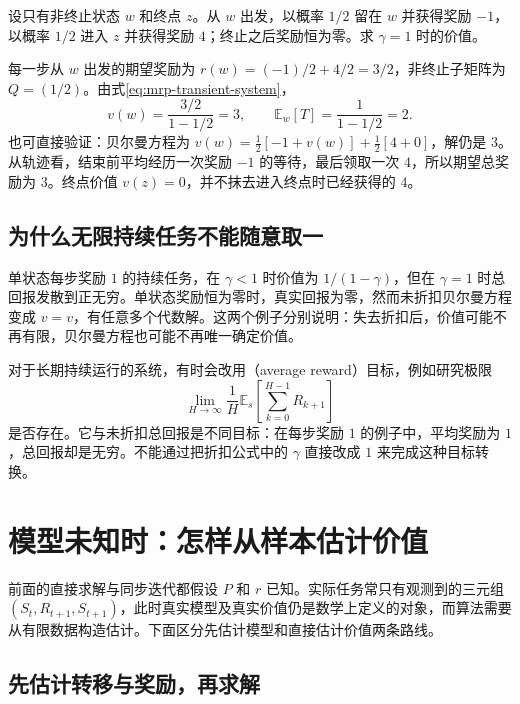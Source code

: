 \documentclass[UTF8]{ctexart}
\begin{document}
\begin{example}[反复等待后结束的未折扣任务]
\label{ex:mrp-terminal}
设只有非终止状态 $w$ 和终点 $z$。从 $w$ 出发，以概率 $1/2$ 留在 $w$ 并获得奖励 $-1$，以概率 $1/2$ 进入 $z$ 并获得奖励 $4$；终止之后奖励恒为零。求 $\gamma=1$ 时的价值。
\end{example}

\begin{solve}
每一步从 $w$ 出发的期望奖励为 $r(w)=(-1)/2+4/2=3/2$，非终止子矩阵为 $Q=(1/2)$。由式\eqref{eq:mrp-transient-system}，
\[
  v(w)=\frac{3/2}{1-1/2}=3,\qquad \mathbb E_w[T]=\frac{1}{1-1/2}=2.
\]
也可直接验证：贝尔曼方程为 $v(w)=\tfrac12[-1+v(w)]+\tfrac12[4+0]$，解仍是 $3$。从轨迹看，结束前平均经历一次奖励 $-1$ 的等待，最后领取一次 $4$，所以期望总奖励为 $3$。终点价值 $v(z)=0$，并不抹去进入终点时已经获得的 $4$。
\end{solve}

\subsection{为什么无限持续任务不能随意取一}

单状态每步奖励 $1$ 的持续任务，在 $\gamma<1$ 时价值为 $1/(1-\gamma)$，但在 $\gamma=1$ 时总回报发散到正无穷。单状态奖励恒为零时，真实回报为零，然而未折扣贝尔曼方程变成 $v=v$，有任意多个代数解。这两个例子分别说明：失去折扣后，价值可能不再有限，贝尔曼方程也可能不再唯一确定价值。

对于长期持续运行的系统，有时会改用（average reward）目标，例如研究极限
\[
  \lim_{H\to\infty}\frac1H
  \mathbb E_s\!\left[\sum_{k=0}^{H-1}R_{k+1}\right]
\]
是否存在。它与未折扣总回报是不同目标：在每步奖励 $1$ 的例子中，平均奖励为 $1$，总回报却是无穷。不能通过把折扣公式中的 $\gamma$ 直接改成 $1$ 来完成这种目标转换。

\section{模型未知时：怎样从样本估计价值}
\label{sec:mrp-learning}

前面的直接求解与同步迭代都假设 $P$ 和 $r$ 已知。实际任务常只有观测到的三元组 $(S_t,R_{t+1},S_{t+1})$，此时真实模型及真实价值仍是数学上定义的对象，而算法需要从有限数据构造估计。下面区分先估计模型和直接估计价值两条路线。

\subsection{先估计转移与奖励，再求解}
\end{document}
